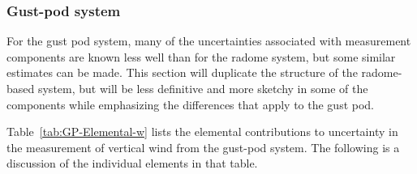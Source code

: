 \documentclass[12pt,twoside,english]{article}\usepackage[]{graphicx}\usepackage[]{color}
\let\OrgIndex\index
\renewcommand*{\index}[1]{\OrgIndex{#1}}
\begin{document}
{{%

\subsubsection{Gust-pod system}

For the gust pod system, many of the uncertainties associated with measurement components are known less well than for the radome system, but some similar estimates can be made. This section will duplicate the structure of the radome-based system, but will be less definitive and more sketchy in some of the components while emphasizing the differences that apply to the gust pod. 

Table~\ref{tab:GP-Elemental-w} lists the elemental contributions to uncertainty in the measurement of vertical wind from the gust-pod system. The following is a discussion of the individual elements in that table. 

}}
\end{document}
